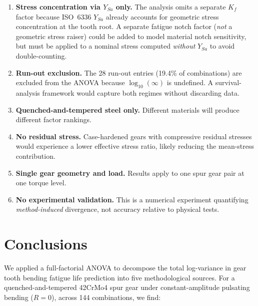 \documentclass[12pt,a4paper]{article}
\begin{document}
\begin{enumerate}
  \item \textbf{Stress concentration via $Y_{Sa}$ only.} The analysis
        omits a separate $K_f$ factor because ISO~6336 $Y_{Sa}$ already
        accounts for geometric stress concentration at the tooth root.
        A separate fatigue notch factor (\emph{not} a geometric stress
        raiser) could be added to model material notch sensitivity, but
        must be applied to a nominal stress computed \emph{without} $Y_{Sa}$
        to avoid double-counting.
  \item \textbf{Run-out exclusion.} The 28 run-out entries (19.4\% of
        combinations) are excluded from the ANOVA because
        $\log_{10}(\infty)$ is undefined. A survival-analysis framework
        would capture both regimes without discarding data.
  \item \textbf{Quenched-and-tempered steel only.} Different materials
        will produce different factor rankings.
  \item \textbf{No residual stress.} Case-hardened gears with compressive
        residual stresses would experience a lower effective stress ratio,
        likely reducing the mean-stress contribution.
  \item \textbf{Single gear geometry and load.} Results apply to one spur
        gear pair at one torque level.
  \item \textbf{No experimental validation.} This is a numerical
        experiment quantifying \emph{method-induced} divergence, not
        accuracy relative to physical tests.
\end{enumerate}

\section{Conclusions}
\label{sec:conclusions}

We applied a full-factorial ANOVA to decompose the total log-variance in
gear tooth bending fatigue life prediction into five methodological
sources. For a quenched-and-tempered 42CrMo4 spur gear under
constant-amplitude pulsating bending ($R=0$), across 144 combinations,
we find:
\end{document}

